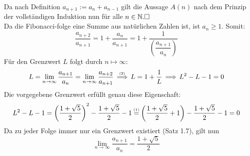 \documentclass[a4paper,graphics,11pt]{article}
\newcommand{\up}[2]{\mathrel{\overset{\makebox[0pt]{\mbox{\normalfont\tiny #2}}}{#1}}}
\begin{document}
Da nach Definition $a_{n+1} := a_n + a_{n-1}$ gilt die Aussage $A(n)$ nach dem Prinzip der vollständigen Induktion nun für alle $n\in \mathbb{N}.\hfill\square$\\
Da die Fibonacci-folge eine Summe aus natürlichen Zahlen ist, ist $a_n \geq 1$. Somit:
\begin{equation}
    \frac{a_{n+2}}{a_{n+1}} = 1+\frac{a_{n}}{a_{n+1}} = 1+\frac{1}{\left(\dfrac{a_{n+1}}{a_{n}}\right)}
\end{equation}
Für den Grenzwert $L$ folgt durch $n\mapsto \infty$:
$$
    L = \lim_{n \to \infty}\frac{a_{n+1}}{a_n} = \lim_{n \to \infty}\frac{a_{n+2}}{a_{n+1}}
    \up{\,\Longrightarrow\,}{(2)} L = 1+ \frac{1}{L} \,\Longrightarrow\, L^2-L-1 = 0
$$
Die vorgegebene Grenzwert erfüllt genau diese Eigenschaft:
$$
    L^2-L-1 = \left(\frac{1+\sqrt{5}}{2}\right)^2-\frac{1+\sqrt{5}}{2}-1
    \up{=}{(1)} \left(\frac{1+\sqrt{5}}{2}+1\right) -\frac{1+\sqrt{5}}{2}-1 = 0
$$
Da zu jeder Folge immer nur ein Grenzwert existiert (Satz 1.7), gilt nun
$$\lim_{n \to \infty} \frac{a_{n+1}}{a_n} = \frac{1+\sqrt{5}}{2}$$
\end{document}
